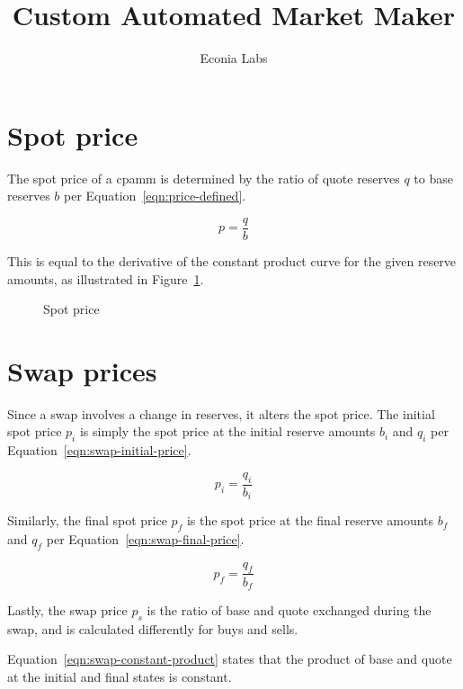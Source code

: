 \documentclass[table, twocolumn]{article}
\title{Custom Automated Market Maker}
\author{Econia Labs}
\date{}
\begin{document}

\maketitle

\section{Spot price}\label{sec:spot-price}

The spot price of a \gls*{cpamm} is determined by the ratio of quote reserves $q$ to
base reserves $b$ per Equation~\ref{eqn:price-defined}.

\begin{equation}\label{eqn:price-defined}
	p = \frac{q}{b}
\end{equation}

This is equal to the derivative of the constant product curve for the given reserve
amounts, as illustrated in Figure~\ref{fig:spot-price}.

\begin{figure}[!htb]
	\centering
	
	\caption{Spot price}\label{fig:spot-price}
\end{figure}

\section{Swap prices}\label{sec:swap-prices}

Since a swap involves a change in reserves, it alters the spot price. The initial spot
price $p_i$ is simply the spot price at the initial reserve amounts $b_i$ and $q_i$ per
Equation~\ref{eqn:swap-initial-price}.

\begin{equation}\label{eqn:swap-initial-price}
	p_i = \frac{q_i}{b_i}
\end{equation}

Similarly, the final spot price $p_f$ is the spot price at the final reserve amounts
$b_f$ and $q_f$ per Equation~\ref{eqn:swap-final-price}.

\begin{equation}\label{eqn:swap-final-price}
	p_f = \frac{q_f}{b_f}
\end{equation}

Lastly, the swap price $p_s$ is the ratio of base and quote exchanged during the swap,
and is calculated differently for buys and sells.

Equation~\ref{eqn:swap-constant-product} states that the product of base and quote at
the initial and final states is constant.
\end{document}
